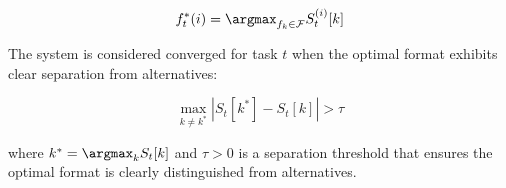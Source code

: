 \begin{equation}
f^*_t(i) = \argmax_{f_k \in \mathcal{F}} S_t^{(i)}[k]
\end{equation}

The system is considered converged for task $t$ when the optimal format exhibits clear separation from alternatives:

\begin{equation}
\max_{k \neq k^*} |S_t[k^*] - S_t[k]| > \tau
\end{equation}

where $k^* = \argmax_k S_t[k]$ and $\tau > 0$ is a separation threshold that ensures the optimal format is clearly distinguished from alternatives.













